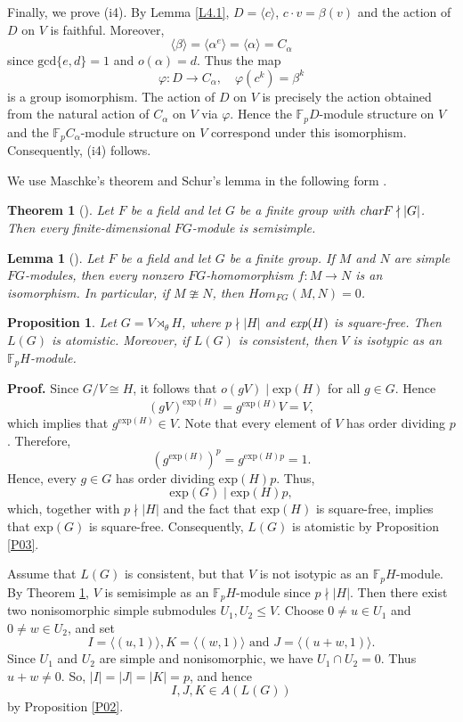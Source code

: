 \documentclass[12pt]{article}
\newtheorem{lemma}{\bf Lemma}[section]
\newtheorem{theorem}{\bf Theorem}[section]
\newtheorem{proposition}{\bf Proposition}[section]
\def\QEDopen{{\setlength{\fboxsep}{0pt}\setlength{\fboxrule}{0.2pt}\fbox{\rule[0pt]{0pt}{1.3ex}\rule[0pt]{1.3ex}{0pt}}}}
\def\QED{\QEDopen}
\def\proof{{\bf Proof.} }
\def\endproof{\hspace*{\fill}~\QED\par\endtrivlist\unskip}
\begin{document}
Finally, we prove (i4). By Lemma \ref{L4.1},
$D=\langle c\rangle$, $c\cdot v=\beta(v)$ and the action of $D$ on $V$ is faithful. 
Moreover, $$\langle \beta\rangle=\langle \alpha^e\rangle=\langle \alpha\rangle=C_\alpha$$ since $\mbox{gcd}\{e,d\}=1$ and $o(\alpha)=d$.
Thus the map 
$$\varphi:D\longrightarrow C_\alpha, \quad \varphi(c^k)=\beta^k$$
is a group isomorphism. 
The action of $D$ on $V$ is precisely 
the action obtained from the natural
action of $C_\alpha$ on $V$ via $\varphi$. Hence the
$\mathbb{F}_pD$-module structure on $V$ and the
$\mathbb{F}_pC_\alpha$-module structure on $V$ correspond under this
isomorphism. Consequently, (i4) follows.
\endproof 

We use Maschke's theorem and Schur's lemma in the following form \cite{Webb, Lux}.
\begin{theorem}[\cite{Webb, Lux}]\label{cq1}
Let $F$ be a field and let $G$ be a finite group
with $\emph{char} F\nmid |G|$. Then every finite-dimensional $FG$-module is semisimple.
\end{theorem}

\begin{lemma}[\cite{Webb,Lux}]\label{LLLL}
Let $F$ be a field and let $G$ be a finite group. 
If $M$ and $N$ are simple $FG$-modules, then every nonzero 
$FG$-homomorphism $f:M\longrightarrow N$ is an isomorphism. 
In particular, if $M\ncong N$, then $Hom_{FG}(M,N)=0$.
\end{lemma}

\begin{proposition}\label{PRO4.1}
Let $G=V\rtimes_{\theta} H$, where $p\nmid |H|$ and $\emph{exp}(H)$ is square-free. Then $L(G)$ is atomistic. Moreover, if $L(G)$ is consistent, then $V$ is isotypic as an $\mathbb{F}_pH$-module.
\end{proposition}
\proof
Since $G/V\cong H$, it follows that $o(gV)\mid \mbox{exp}(H)$ for all $g\in G$. Hence $$(gV)^{\mbox{exp}(H)}=g^{\mbox{exp}(H)}V=V,$$ 
which implies that $g^{\mbox{exp}(H)}\in V$. Note that every element of $V$ has order dividing $p$. Therefore,
$$(g^{\mbox{exp}(H)})^p=g^{\mbox{exp}(H)p}=1.$$
Hence, every $g\in G$ has order dividing $\mbox{exp}(H)p$. Thus,
\begin{equation*}
\mbox{exp}(G)\mid \mbox{exp}(H)p,
\end{equation*}
which, together with $p\nmid |H|$ and the fact that $\mbox{exp}(H)$ is square-free, implies that $\mbox{exp}(G)$ is square-free. Consequently, $L(G)$ is atomistic by Proposition \ref{P03}.

Assume that $L(G)$ is consistent, but that $V$ is not isotypic as an $\mathbb{F}_p H$-module. By Theorem \ref{cq1}, $V$ is semisimple as an $\mathbb{F}_pH$-module since $p\nmid |H|$. 
Then there exist two nonisomorphic simple submodules $U_1, U_2\leq V$. Choose $0\neq u\in U_1$ and $0\neq w\in U_2$, 
and set 
$$I=\langle (u,1)\rangle, K=\langle (w,1)\rangle \mbox{ and } J=\langle (u+w,1)\rangle.$$ 
Since $U_1$ and $U_2$ are simple and nonisomorphic, we have
$U_1\cap U_2=0$. Thus $u+w\neq 0$. 
So, $|I|=|J|=|K|=p$, and hence 
\begin{equation}\label{+EQation}
 I, J, K\in A(L(G))   
\end{equation} 
by Proposition \ref{P02}. 
\end{document}
